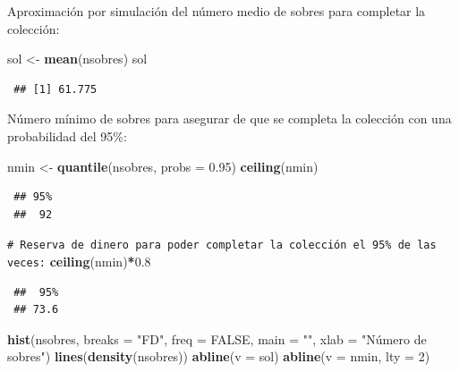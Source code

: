 \documentclass[
  spanish,
  10pt,
]{book}
\newenvironment{Shaded}{\begin{snugshade}}{\end{snugshade}}
\newcommand{\AttributeTok}[1]{\textcolor[rgb]{0.13,0.29,0.53}{#1}}
\newcommand{\CommentTok}[1]{\textcolor[rgb]{0.56,0.35,0.01}{\textit{#1}}}
\newcommand{\ConstantTok}[1]{\textcolor[rgb]{0.56,0.35,0.01}{#1}}
\newcommand{\DecValTok}[1]{\textcolor[rgb]{0.00,0.00,0.81}{#1}}
\newcommand{\FloatTok}[1]{\textcolor[rgb]{0.00,0.00,0.81}{#1}}
\newcommand{\FunctionTok}[1]{\textcolor[rgb]{0.13,0.29,0.53}{\textbf{#1}}}
\newcommand{\NormalTok}[1]{#1}
\newcommand{\OtherTok}[1]{\textcolor[rgb]{0.56,0.35,0.01}{#1}}
\newcommand{\SpecialCharTok}[1]{\textcolor[rgb]{0.81,0.36,0.00}{\textbf{#1}}}
\newcommand{\StringTok}[1]{\textcolor[rgb]{0.31,0.60,0.02}{#1}}
\theoremstyle{break}
\theoremstyle{nonumberplain}
\renewcommand{\CommentTok}[1]{\textcolor[rgb]{0.41,0.41,0.41}{\texttt{#1}}}
\begin{document}
Aproximación por simulación del número medio de sobres para completar la colección:

\begin{Shaded}
\begin{Highlighting}[]
\NormalTok{sol }\OtherTok{\textless{}{-}} \FunctionTok{mean}\NormalTok{(nsobres)}
\NormalTok{sol}
\end{Highlighting}
\end{Shaded}

\begin{verbatim}
 ## [1] 61.775
\end{verbatim}

Número mínimo de sobres para asegurar de que se completa la colección con una probabilidad del 95\%:

\begin{Shaded}
\begin{Highlighting}[]
\NormalTok{nmin }\OtherTok{\textless{}{-}} \FunctionTok{quantile}\NormalTok{(nsobres, }\AttributeTok{probs =} \FloatTok{0.95}\NormalTok{)}
\FunctionTok{ceiling}\NormalTok{(nmin)}
\end{Highlighting}
\end{Shaded}

\begin{verbatim}
 ## 95% 
 ##  92
\end{verbatim}

\begin{Shaded}
\begin{Highlighting}[]
\CommentTok{\# Reserva de dinero para poder completar la colección el 95\% de las veces:}
\FunctionTok{ceiling}\NormalTok{(nmin)}\SpecialCharTok{*}\FloatTok{0.8}
\end{Highlighting}
\end{Shaded}

\begin{verbatim}
 ##  95% 
 ## 73.6
\end{verbatim}

\begin{Shaded}
\begin{Highlighting}[]
\FunctionTok{hist}\NormalTok{(nsobres, }\AttributeTok{breaks =} \StringTok{"FD"}\NormalTok{, }\AttributeTok{freq =} \ConstantTok{FALSE}\NormalTok{,}
     \AttributeTok{main =} \StringTok{""}\NormalTok{, }\AttributeTok{xlab =} \StringTok{"Número de sobres"}\NormalTok{)}
\FunctionTok{lines}\NormalTok{(}\FunctionTok{density}\NormalTok{(nsobres))}
\FunctionTok{abline}\NormalTok{(}\AttributeTok{v =}\NormalTok{ sol)}
\FunctionTok{abline}\NormalTok{(}\AttributeTok{v =}\NormalTok{ nmin, }\AttributeTok{lty =} \DecValTok{2}\NormalTok{)}
\end{Highlighting}
\end{Shaded}
\end{document}
